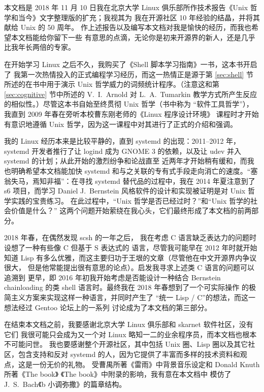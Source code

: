 \documentclass[UTF8]{ctexart}
\begin{document}
本文档是 2018 年 11 月 10 日我在北京大学 Linux 俱乐部所作技术报告《Unix
哲学和当今》\nolinebreak{}文字整理版的扩充；我视其为
我在开源社区 10 年经验的结晶，并将其献给 Unix 的 50 周年。
作上述报告以及编写本文档对我是愉快的经历，而我也希望本文档能给你留下一些
有意思的点滴，无论你是初来开源界的新人，还是几乎比我年长两倍的专家。





\newpart
\begingroup
\setlength{\hfuzz}{7.5pt}
\printbibliography[heading = bibintoc, title = 参考资料]
\endgroup
\newpart
{}\label{sec:afterword}

在开始学习 Linux 之后不久，我购买了《Shell 脚本学习指南》一书，这本书开启了
我第一次热情投入的正式编程学习经历，而这一热情正是源于第 \ref{sec:shell}
节所述的在书中用于演示 Unix 哲学威力的词频统计程序。（注意这和第
\ref{sec:cognitive} 节中所述的 V.\ I.\ Arnold 对 L.\ A.\ Tumarkin
教学方式所产生反应的相似性。）尽管这本书自始至终贯彻 Unix 哲学（书中称为
“软件工具哲学”），我直到 2009 年春在旁听本校曹东刚老师的《Linux 程序设计环境》
课程时才开始有意识地遵循 Unix 哲学，因为这一课程中对其进行了正式的介绍和强调。

我的 Linux 经历本来是比较平静的，直到 systemd 的出现：2011--2012 年，systemd
开发者推行了让 logind 成为 GNOME 3 的依赖，以及让
udev 并入 systemd 的计划；从此开始的激烈纷争和论战直至
近两年才开始稍有缓和，而我也明确希望本文档能加快
systemd 和与之关联的专有式手段走向消亡的速度。“塞翁失马，焉知非福”：在寻找
systemd 替代品的过程中，我在 2014 年夏注意到了 s6 项目，而学习 Daniel
J.\ Bernstein 风格软件的设计和实现被证明是对 Unix 哲学实践的宝贵练习。
在此过程中，“Unix 哲学是否已经过时？”和“Unix 哲学的社会价值是什么？”
这两个问题开始萦绕在我心头，它们最终形成了本文档的前两部分。

2018 年春，在偶然发现 scsh 的一年之后，
我在考虑 C 语言缺乏表达力的问题时设想了一种有些像 C 但基于 S 表达式的
语言，尽管我可能早在 2012 年时就开始知道 Lisp
有多么优雅，而这主要归功于王垠的文章（尽管他在中文开源界内争议很大，
但是他常能提出很有意思的论点）。启发我寻求上述类 C 语言的问题可以追溯到
更早，即 2016 年初我开始考虑是否能设计一种结合 Bernstein chainloading 的类
shell 语言时。最终我在 2018 年春想到了一个可实际操作
的极简主义方案来实现这样一种语言，并同时产生了
“统一 Lisp / C”的想法，而这一想法经过 Gentoo 论坛上的一系列
讨论成为了本文档的第三部分。

在结束本文档之前，我要感谢北京大学 Linux 俱乐部和 skarnet 软件社区，没有它们
我很可能只会成为又一个对 Linux 略知一二的业余程序员，而本文档也根本不可能问世。
我也要感谢整个开源社区，其中包括 Unix 圈、Lisp 圈以及其它社区，包含支持和反对
systemd 的人，因为它提供了丰富而多样的技术资料和观点，这是一份无价的礼物。
受曹禺所著《雷雨》中背景音乐设定和 Donald Knuth 所著《The book》%
《The book》中附录的影响，我有意在本文档中
模仿了 J.\ S.\ Bach《b 小调弥撒》的篇章结构。
\end{document}
